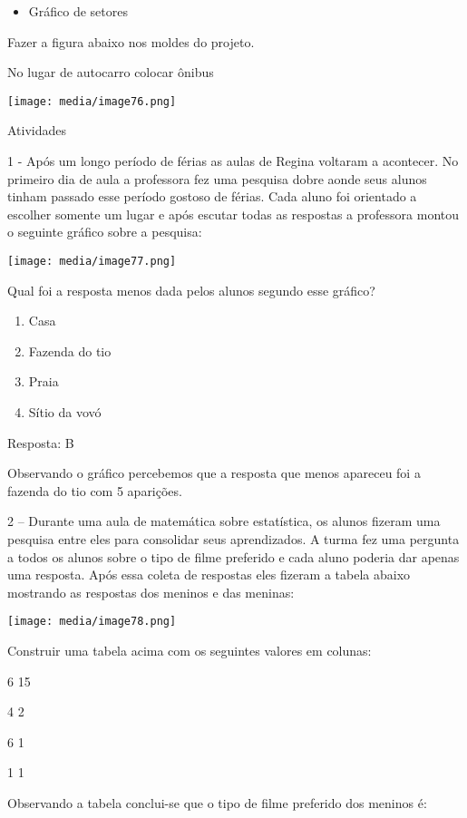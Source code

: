 \begin{itemize}
\item
  Gráfico de setores
\end{itemize}

Fazer a figura abaixo nos moldes do projeto.

No lugar de autocarro colocar ônibus

\texttt{[image: media/image76.png]}

Atividades

1 - Após um longo período de férias as aulas de Regina voltaram a
acontecer. No primeiro dia de aula a professora fez uma pesquisa dobre
aonde seus alunos tinham passado esse período gostoso de férias. Cada
aluno foi orientado a escolher somente um lugar e após escutar todas as
respostas a professora montou o seguinte gráfico sobre a pesquisa:

\texttt{[image: media/image77.png]}

Qual foi a resposta menos dada pelos alunos segundo esse gráfico?

\begin{enumerate}
\def\labelenumi{\alph{enumi})}
\item
  Casa
\item
  Fazenda do tio
\item
  Praia
\item
  Sítio da vovó
\end{enumerate}

Resposta: B

Observando o gráfico percebemos que a resposta que menos apareceu foi a
fazenda do tio com 5 aparições.

2 -- Durante uma aula de matemática sobre estatística, os alunos fizeram
uma pesquisa entre eles para consolidar seus aprendizados. A turma fez
uma pergunta a todos os alunos sobre o tipo de filme preferido e cada
aluno poderia dar apenas uma resposta. Após essa coleta de respostas
eles fizeram a tabela abaixo mostrando as respostas dos meninos e das
meninas:

\texttt{[image: media/image78.png]}

Construir uma tabela acima com os seguintes valores em colunas:

6 15

4 2

6 1

1 1

Observando a tabela conclui-se que o tipo de filme preferido dos meninos
é:

